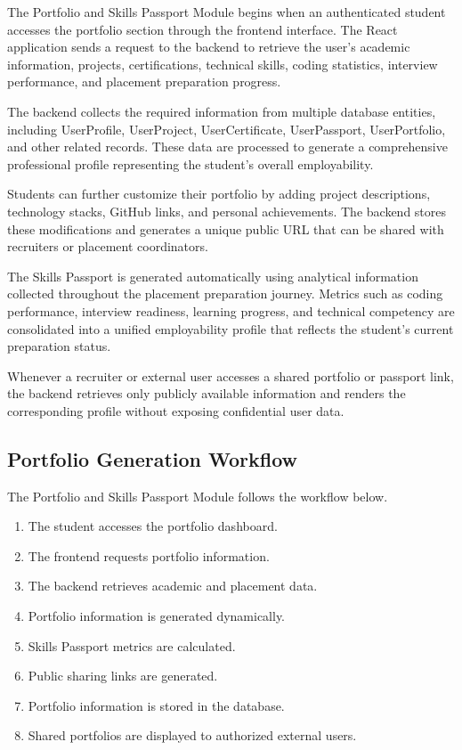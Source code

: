The Portfolio and Skills Passport Module begins when an authenticated student accesses the portfolio section through the frontend interface. The React application sends a request to the backend to retrieve the user's academic information, projects, certifications, technical skills, coding statistics, interview performance, and placement preparation progress.

The backend collects the required information from multiple database entities, including UserProfile, UserProject, UserCertificate, UserPassport, UserPortfolio, and other related records. These data are processed to generate a comprehensive professional profile representing the student's overall employability.

Students can further customize their portfolio by adding project descriptions, technology stacks, GitHub links, and personal achievements. The backend stores these modifications and generates a unique public URL that can be shared with recruiters or placement coordinators.

The Skills Passport is generated automatically using analytical information collected throughout the placement preparation journey. Metrics such as coding performance, interview readiness, learning progress, and technical competency are consolidated into a unified employability profile that reflects the student's current preparation status.

Whenever a recruiter or external user accesses a shared portfolio or passport link, the backend retrieves only publicly available information and renders the corresponding profile without exposing confidential user data.

\subsection{Portfolio Generation Workflow}

The Portfolio and Skills Passport Module follows the workflow below.

\begin{enumerate}

\item The student accesses the portfolio dashboard.

\item The frontend requests portfolio information.

\item The backend retrieves academic and placement data.

\item Portfolio information is generated dynamically.

\item Skills Passport metrics are calculated.

\item Public sharing links are generated.

\item Portfolio information is stored in the database.

\item Shared portfolios are displayed to authorized external users.

\end{enumerate}

